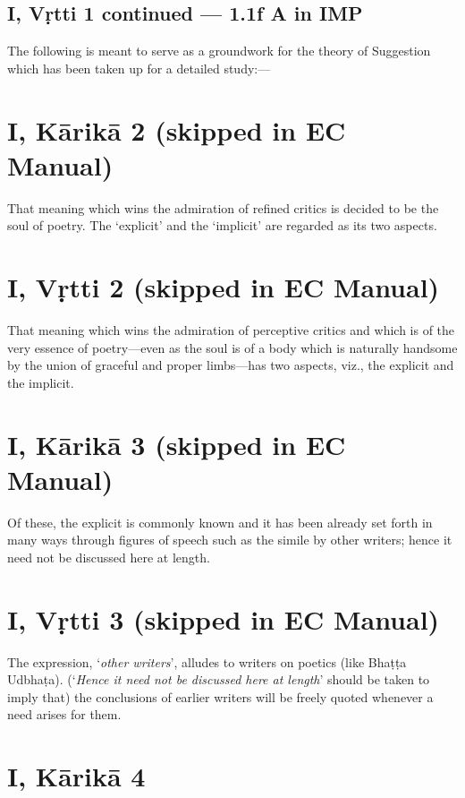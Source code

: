 \documentclass[12pt]{book}
\begin{document}
\subsection{I, Vṛtti 1 continued --- 1.1f A in IMP}

The following is meant to serve as a groundwork for the
theory of Suggestion which has been taken up for a detailed
study:---


\section{I, Kārikā 2 (skipped in EC Manual)}

That meaning which wins the admiration of refined critics
is decided to be the soul of poetry. The `explicit' and the
`implicit' are regarded as its two aspects.


\section{I, Vṛtti 2 (skipped in EC Manual)}

That meaning which wins the admiration of perceptive
critics and which is of the very essence of poetry---even as the
soul is of a body which is naturally handsome by the union of
graceful and proper limbs---has two aspects, viz., the explicit
and the implicit.


\section{I, Kārikā 3 (skipped in EC Manual)}

Of these, the explicit is commonly known and it has been
already set forth in many ways through figures of speech such
as the simile by other writers; hence it need not be discussed
here at length.


\section{I, Vṛtti 3 (skipped in EC Manual)}

The expression, `\textit{other writers}', alludes to writers on poetics
(like Bhaṭṭa Udbhaṭa). (`\textit{Hence it need not be discussed here at
length}' should be taken to imply that) the conclusions of earlier
writers will be freely quoted whenever a need arises for them.


\section{I, Kārikā 4}
\end{document}
